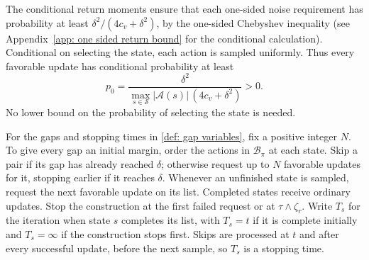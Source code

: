 The conditional return moments ensure that each one-sided noise requirement has probability at least $\delta^2/(4c_v+\delta^2)$, by the one-sided Chebyshev inequality (see Appendix~\ref{app: one sided return bound} for the conditional calculation). Conditional on selecting the state, each action is sampled uniformly. Thus every favorable update has conditional probability at least
\begin{equation}
\label{eq:localprob}
p_0=\frac{\delta^2}{\max_{s\in\mathcal S}|\mathcal A(s)|\,(4c_v+\delta^2)}>0.
\end{equation}
No lower bound on the probability of selecting the state is needed.

\begin{definition}
\label{def: seed construction}
For the gaps and stopping times in \autoref{def: gap variables}, fix a positive integer $N$. To give every gap an initial margin, order the actions in $\mathcal B_\pi$ at each state. Skip a pair if its gap has already reached $\delta$; otherwise request up to $N$ favorable updates for it, stopping earlier if it reaches $\delta$. Whenever an unfinished state is sampled, request the next favorable update on its list. Completed states receive ordinary updates. Stop the construction at the first failed request or at $\tau\wedge\zeta_r$.
Write $T_s$ for the iteration when state $s$ completes its list, with $T_s=t$ if it is complete initially and $T_s=\infty$ if the construction stops first. Skips are processed at $t$ and after every successful update, before the next sample, so $T_s$ is a stopping time.
\end{definition}

